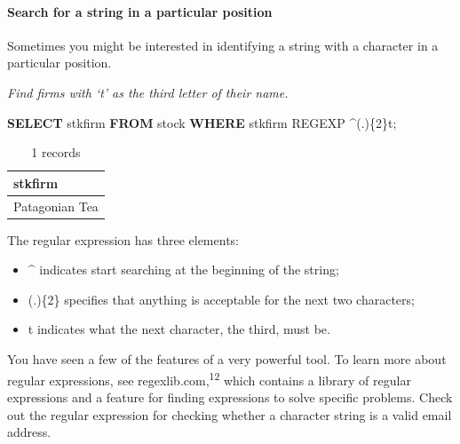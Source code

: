\documentclass[
]{article}
\newenvironment{Shaded}{\begin{snugshade}}{\end{snugshade}}
\newcommand{\KeywordTok}[1]{\textcolor[rgb]{0.13,0.29,0.53}{\textbf{#1}}}
\newcommand{\NormalTok}[1]{#1}
\newcommand{\StringTok}[1]{\textcolor[rgb]{0.31,0.60,0.02}{#1}}
\begin{document}
\hypertarget{search-for-a-string-in-a-particular-position}{%
\paragraph*{Search for a string in a particular position}\label{search-for-a-string-in-a-particular-position}}

Sometimes you might be interested in identifying a string with a
character in a particular position.

\emph{Find firms with `t' as the third letter of their name.}

\begin{Shaded}
\begin{Highlighting}[]
\KeywordTok{SELECT}\NormalTok{ stkfirm }\KeywordTok{FROM}\NormalTok{ stock }\KeywordTok{WHERE}\NormalTok{ stkfirm REGEXP }\StringTok{\textquotesingle{}\^{}(.)\{2\}t\textquotesingle{}}\NormalTok{;}
\end{Highlighting}
\end{Shaded}

\begin{table}

\caption{\label{tab:unnamed-chunk-51}1 records}
\centering
\begin{tabular}[t]{l}
\hline
stkfirm\\
\hline
Patagonian Tea\\
\hline
\end{tabular}
\end{table}

The regular expression has three elements:

\begin{itemize}
\item
  \^{} indicates start searching at the beginning of the string;
\item
  (.)\{2\} specifies that anything is acceptable for the next two
  characters;
\item
  t indicates what the next character, the third, must be.
\end{itemize}

You have seen a few of the features of a very powerful tool. To learn
more about regular expressions, see regexlib.com,\textsuperscript{12} which contains a
library of regular expressions and a feature for finding expressions to
solve specific problems. Check out the regular expression for checking
whether a character string is a valid email address.
\end{document}
